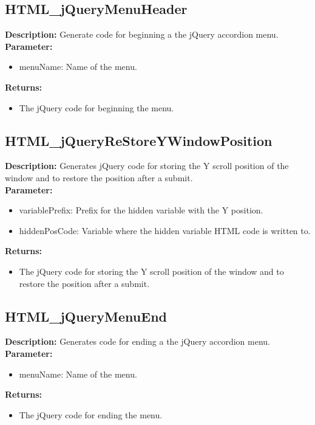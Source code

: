 \subsection{HTML\_jQueryMenuHeader}
\textbf{Description:} Generate code for beginning a the jQuery accordion menu.\\
\textbf{Parameter:}
\begin{itemize}
\item menuName: Name of the menu.
\end{itemize}
\textbf{Returns:}
\begin{itemize}
\item The jQuery code for beginning the menu.
\end{itemize}

\subsection{HTML\_jQueryReStoreYWindowPosition}
\textbf{Description:} Generates jQuery code for storing the Y scroll position of the window and to restore the position after a submit.\\
\textbf{Parameter:}
\begin{itemize}
\item variablePrefix: Prefix for the hidden variable with the Y position.
\item hiddenPosCode: Variable where the hidden variable HTML code is written to.
\end{itemize}
\textbf{Returns:}
\begin{itemize}
\item The jQuery code for storing the Y scroll position of the window and to restore the position after a submit.
\end{itemize}

\subsection{HTML\_jQueryMenuEnd}
\textbf{Description:} Generates code for ending a the jQuery accordion menu.\\
\textbf{Parameter:}
\begin{itemize}
\item menuName: Name of the menu.
\end{itemize}
\textbf{Returns:}
\begin{itemize}
\item The jQuery code for ending the menu.
\end{itemize}

